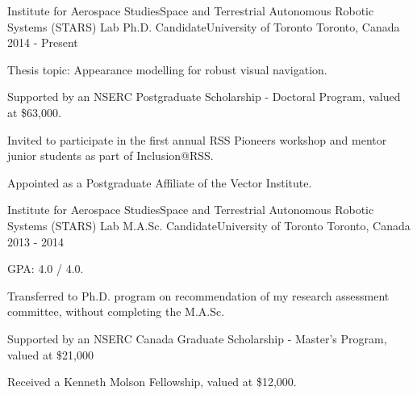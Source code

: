 

\begin{cventries}

  \cventry
    {Institute for Aerospace Studies{\enskip\cdotp\enskip}Space and Terrestrial Autonomous Robotic Systems (STARS) Lab} %
    {Ph.D. Candidate{\enskip\cdotp\enskip}University of Toronto} %
    {Toronto, Canada} %
    {2014 - Present} %
    {
      \begin{cvitems} %
        \item {Thesis topic: Appearance modelling for robust visual navigation.}
        \item {Supported by an NSERC Postgraduate Scholarship - Doctoral Program, valued at \$63,000.}
        \item {Invited to participate in the first annual RSS Pioneers workshop and mentor junior students as part of Inclusion@RSS.}
        \item {Appointed as a Postgraduate Affiliate of the Vector Institute.}
      \end{cvitems}
    }

  \cventry
    {Institute for Aerospace Studies{\enskip\cdotp\enskip}Space and Terrestrial Autonomous Robotic Systems (STARS) Lab} %
    {M.A.Sc. Candidate{\enskip\cdotp\enskip}University of Toronto} %
    {Toronto, Canada} %
    {2013 - 2014} %
    {
      \begin{cvitems} %
        \item {GPA: 4.0 / 4.0.}
        \item {Transferred to Ph.D. program on recommendation of my research assessment committee, without completing the M.A.Sc.}
        \item {Supported by an NSERC Canada Graduate Scholarship - Master’s Program, valued at \$21,000} 
        \item {Received a Kenneth Molson Fellowship, valued at \$12,000.}
      \end{cvitems}
    }


\end{cventries}
